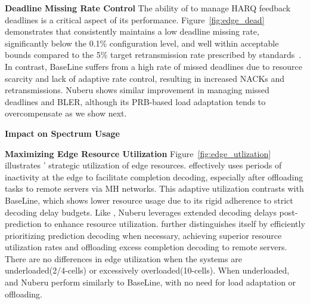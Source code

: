 \textbf{Deadline Missing Rate Control}
The ability of \Name{} to manage HARQ feedback deadlines is a critical aspect of its performance. Figure~\ref{fig:edge_dead} demonstrates that \Name{} consistently maintains a low deadline missing rate, significantly below the 0.1\% configuration level, and well within acceptable bounds compared to the 5\% target retransmission rate prescribed by standards~\cite{3gpp}. In contrast, BaseLine suffers from a high rate of missed deadlines due to resource scarcity and lack of adaptive rate control, resulting in increased NACKs and retransmissions. Nuberu shows similar improvement in managing missed deadlines and BLER, although its PRB-based load adaptation tends to overcompensate as we show next.


\textbf{Impact on Spectrum Usage}

\textbf{Maximizing Edge Resource Utilization}
Figure~\ref{fig:edge_utlization} illustrates \Name{}' strategic utilization of edge resources. \Name{} effectively uses periods of inactivity at the edge to facilitate completion decoding, especially after offloading tasks to remote servers via MH networks. This adaptive utilization contrasts with BaseLine, which shows lower resource usage due to its rigid adherence to strict decoding delay budgets. Like \Name{}, Nuberu leverages extended decoding delays post-prediction to enhance resource utilization. \Name{} further distinguishes itself by efficiently prioritizing prediction decoding when necessary, achieving superior resource utilization rates and offloading excess completion decoding to remote servers.
There are no differences in edge utilization when the systems are underloaded(2/4-cells) or excessively overloaded(10-cells). When underloaded, \Name{} and Nuberu perform similarly to BaseLine, with no need for load adaptation or offloading.

